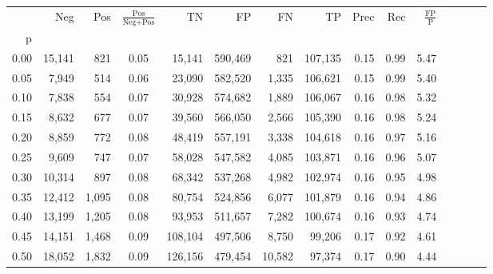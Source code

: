\begin{tabular}{rrrcrrrrrrrrrrr}
\toprule
{} &     Neg &     Pos & $\frac{\text{Pos}}{\text{Neg}+\text{Pos}}$ &       TN &       FP &       FN &       TP &  Prec &   Rec & $\frac{\text{FP}}{\text{P}}$ \\
p    &         &         &                                            &          &          &          &          &       &       &                              \\
\midrule
0.00 &  15,141 &     821 &                                       0.05 &   15,141 &  590,469 &      821 &  107,135 &  0.15 &  0.99 &                         5.47 \\
0.05 &   7,949 &     514 &                                       0.06 &   23,090 &  582,520 &    1,335 &  106,621 &  0.15 &  0.99 &                         5.40 \\
0.10 &   7,838 &     554 &                                       0.07 &   30,928 &  574,682 &    1,889 &  106,067 &  0.16 &  0.98 &                         5.32 \\
0.15 &   8,632 &     677 &                                       0.07 &   39,560 &  566,050 &    2,566 &  105,390 &  0.16 &  0.98 &                         5.24 \\
0.20 &   8,859 &     772 &                                       0.08 &   48,419 &  557,191 &    3,338 &  104,618 &  0.16 &  0.97 &                         5.16 \\
0.25 &   9,609 &     747 &                                       0.07 &   58,028 &  547,582 &    4,085 &  103,871 &  0.16 &  0.96 &                         5.07 \\
0.30 &  10,314 &     897 &                                       0.08 &   68,342 &  537,268 &    4,982 &  102,974 &  0.16 &  0.95 &                         4.98 \\
0.35 &  12,412 &   1,095 &                                       0.08 &   80,754 &  524,856 &    6,077 &  101,879 &  0.16 &  0.94 &                         4.86 \\
0.40 &  13,199 &   1,205 &                                       0.08 &   93,953 &  511,657 &    7,282 &  100,674 &  0.16 &  0.93 &                         4.74 \\
0.45 &  14,151 &   1,468 &                                       0.09 &  108,104 &  497,506 &    8,750 &   99,206 &  0.17 &  0.92 &                         4.61 \\
0.50 &  18,052 &   1,832 &                                       0.09 &  126,156 &  479,454 &   10,582 &   97,374 &  0.17 &  0.90 &                         4.44 \\

\end{tabular}
